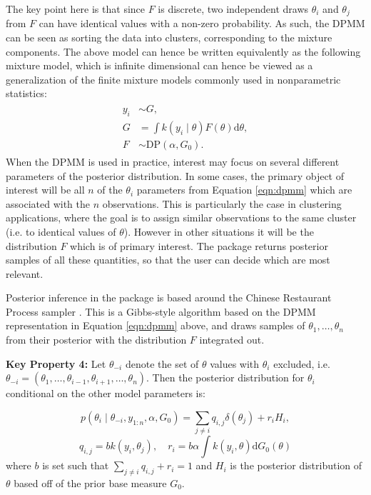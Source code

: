 \documentclass[nojss]{jss}
\begin{document}
The key point here is that since $F$ is discrete, two independent draws $\theta_i$ and $\theta_j$ from $F$  can have identical values with a non-zero probability. As such, the DPMM can be seen as sorting the data into clusters, corresponding to the mixture components. The above model can hence be written equivalently as the following mixture model, which is infinite dimensional can hence be viewed as a generalization of the finite mixture models commonly used in nonparametric statistics:
\begin{align*}
\begin{split}
y_i &\sim G, \\
G & = \int k(y_i \mid \theta) F(\theta) \mathrm{d} \theta ,\\
F &\sim \text{DP} (\alpha, G_0).
\end{split}
\label{eqn:dp2}
\end{align*}
When the DPMM is used in practice, interest may focus on several different parameters of the posterior distribution. In some cases, the primary object of interest will be all $n$ of the ${\theta_i}$ parameters from Equation \ref{eqn:dpmm} which are associated with the $n$ observations. This is particularly the case in clustering applications, where the goal is to assign similar observations to the same cluster (i.e. to identical values of $\theta$). However in other situations it will be the distribution $F$ which is of primary interest. The  package returns posterior samples of all these quantities, so that the user can decide which are most relevant.

Posterior inference in the  package is based around the Chinese Restaurant Process sampler \citep{neal_markov_2000}. This is a Gibbs-style algorithm based on the DPMM representation in Equation \ref{eqn:dpmm} above, and draws samples of $\theta_1,\ldots,\theta_n$ from their posterior with the distribution $F$ integrated out.

\begin{tcolorbox}
\textbf{Key Property 4:}  Let $\theta_{-i}$ denote the set of $\theta$ values with $\theta_i$ excluded, i.e. $\theta_{-i} = (\theta_1,\ldots,\theta_{i-1},\theta_{i+1},\ldots,\theta_n)$. Then the posterior distribution for $\theta_i$ conditional on the other model parameters is:

$$p(\theta_i \mid \theta_{-i}, y_{1:n},\alpha,G_0) = \sum _{j \neq i} q_{i,j} \delta (\theta_j ) + r_i H_i,$$
$$q_{i,j} = b k(y_i , \theta _j),  \quad r_i = b \alpha \int k(y_i , \theta) \mathrm{d} G_0 ( \theta )$$
where $b$ is set such that $\sum _{j \neq i } q_{i,j} + r_i = 1$ and $H_i$ is the posterior distribution of $\theta$ based off of the prior base measure $G_0$.
\end{tcolorbox}
\end{document}

